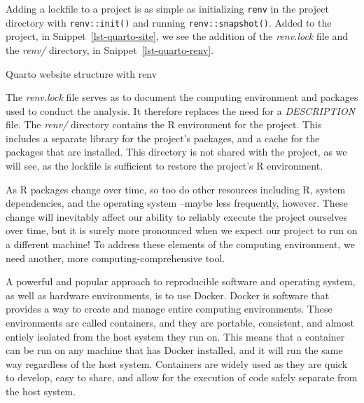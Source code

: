 \documentclass[
  letterpaper,
]{latex/krantz}
\theoremstyle{definition}
\theoremstyle{remark}
\begin{document}
Adding a lockfile to a project is as simple as initializing
\texttt{renv} in the project directory with \texttt{renv::init()} and
running \texttt{renv::snapshot()}. Added to the project, in
Snippet~\ref{lst-quarto-site}, we see the addition of the
\emph{renv.lock} file and the \emph{renv/} directory, in
Snippet~\ref{lst-quarto-renv}.

\begin{codelisting}

\caption{\label{lst-quarto-renv}Quarto website structure with renv}


\end{codelisting}%

The \emph{renv.lock} file serves as to document the computing
environment and packages used to conduct the analysis. It therefore
replaces the need for a \emph{DESCRIPTION} file. The \emph{renv/}
directory contains the R environment for the project. This includes a
separate library for the project's packages, and a cache for the
packages that are installed. This directory is not shared with the
project, as we will see, as the lockfile is sufficient to restore the
project's R environment.

As R packages change over time, so too do other resources including R,
system dependencies, and the operating system --maybe less frequently,
however. These change will inevitably affect our ability to reliably
execute the project ourselves over time, but it is surely more
pronounced when we expect our project to run on a different machine! To
address these elements of the computing environment, we need another,
more computing-comprehensive tool.

A powerful and popular approach to reproducible software and operating
system, as well as hardware environments, is to use Docker. Docker is
software that provides a way to create and manage entire computing
environments. These environments are called containers, and they are
portable, consistent, and almost entiely isolated from the host system
they run on. This means that a container can be run on any machine that
has Docker installed, and it will run the same way regardless of the
host system. Containers are widely used as they are quick to develop,
easy to share, and allow for the execution of code safely separate from
the host system.
\end{document}
